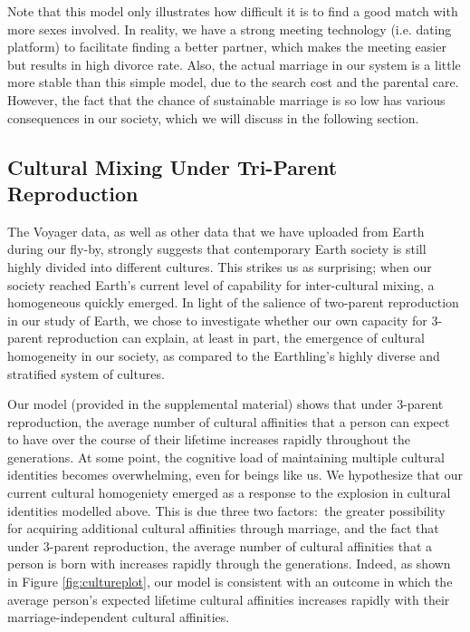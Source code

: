 \documentclass{report}
\begin{document}
Note that this model only illustrates how difficult it is to find a good match with more sexes involved. In reality, we have a strong meeting technology (i.e. dating platform) to facilitate finding a better partner, which makes the meeting easier but results in high divorce rate.
Also, the actual marriage in our system is a little more stable than this simple model, due to the search cost and the parental care. However, the fact that the chance of sustainable marriage is so low has various consequences in our society, which we will discuss in the following section.

\subsection{Cultural Mixing Under Tri-Parent Reproduction}

The Voyager data, as well as other data that we have uploaded from Earth during our fly-by, strongly suggests that contemporary Earth society is still highly divided into different cultures. This strikes us as surprising; when our society reached Earth's current level of capability for inter-cultural mixing, a homogeneous quickly emerged. In light of the salience of two-parent reproduction in our study of Earth, we chose to investigate whether our own capacity for $3$-parent reproduction can explain, at least in part, the emergence of cultural homogeneity in our society, as compared to the Earthling's highly diverse and stratified system of cultures.\par 

Our model (provided in the supplemental material) shows that under 3-parent reproduction, the average number of cultural affinities that a person can expect to have over the course of their lifetime increases rapidly throughout the generations. At some point, the cognitive load of maintaining multiple cultural identities becomes overwhelming, even for beings like us. We hypothesize that our current cultural homogeniety emerged as a response to the explosion in cultural identities modelled above. This is due three two factors:\ the greater possibility for acquiring additional cultural affinities through marriage, and the fact that under 3-parent reproduction, the average number of cultural affinities that a person is born with increases rapidly through the generations. Indeed, as shown in Figure \ref{fig:cultureplot}, our model is consistent with an outcome in which the average person's expected lifetime cultural affinities increases rapidly with their marriage-independent cultural affinities.\par 
\end{document}
